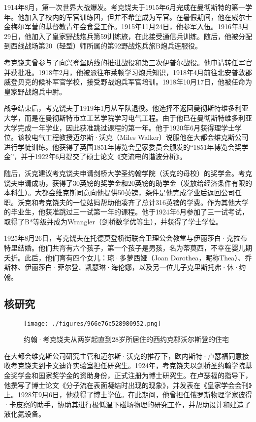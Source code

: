 1914年8月，第一次世界大战爆发。考克饶夫于1915年6月完成在曼彻斯特的第一学年。他加入了校内的军官训练团，但并不希望成为军官。在暑假期间，他在威尔士金梅尔军营的基督教青年会食堂工作。1915年11月24日，他参军入伍。1916年3月29日，他加入了皇家野战炮兵第59训练旅，在此接受通信兵训练。随后，他被分配到西线战场第20（轻型）师所属的第92野战炮兵旅B炮兵连服役。

考克饶夫曾参与了向兴登堡防线的推进战役和第三次伊普尔战役。他申请转任军官并获批准。1918年2月，他被派往布莱顿学习炮兵知识，1918年4月前往北安普敦郡威登贝克的候补军官学校，接受野战炮兵军官培训。1918年10月17日，他被任命为皇家野战炮兵中尉。

战争结束后，考克饶夫于1919年1月从军队退役。他选择不返回曼彻斯特维多利亚大学，而是在曼彻斯特市立工艺学院学习电气工程。由于他已在曼彻斯特维多利亚大学完成一年学业，因此获准跳过课程的第一年。他于1920年6月获得理学士学位。该校电气工程教授迈尔斯·沃克（Miles Walker）说服他在大都会维克斯公司进行学徒训练。他获得了英国1851年博览会皇家委员会颁发的“1851年博览会奖学金”，并于1922年6月提交了硕士论文《交流电的谐波分析》。

随后，沃克建议考克饶夫申请剑桥大学圣约翰学院（沃克的母校）的奖学金。考克饶夫申请成功，获得了30英镑的奖学金和20英镑的助学金（发放给经济条件有限的本科生）。大都会维克斯同意向他提供50英镑，条件是他完成学业后返回公司任职。沃克和考克饶夫的一位姑妈帮助他凑齐了总计316英镑的学费。作为其他大学的毕业生，他获准跳过三一试第一年的课程。他于1924年6月参加了三一试考试，取得了B*等级并成为Wrangler（剑桥数学优等生），并获得了学士学位。

1925年8月26日，考克饶夫在托德莫登桥街联合卫理公会教堂与伊丽莎白·克拉布特里结婚。他们共育有六个孩子，第一个孩子是男孩，名为蒂莫西，不幸在婴儿期夭折。此后，他们育有四个女儿：琼·多萝西娅（Joan Dorothea，昵称Thea）、乔斯林、伊丽莎白·菲尔登、凯瑟琳·海伦娜，以及另一位儿子克里斯托弗·休·约翰。
\subsection{核研究}
\begin{figure}[ht]
\centering
\texttt{[image: ./figures/966e76c528980952.png]}
\caption{约翰·考克饶夫从两岁起直到28岁所居住的西约克郡沃尔斯登的住宅} \label{fig_YHkrf_2}
\end{figure}
在大都会维克斯公司研究主管和迈尔斯·沃克的推荐下，欧内斯特·卢瑟福同意接收考克饶夫到卡文迪许实验室担任研究生。1924年，考克饶夫以剑桥圣约翰学院基金奖学金和国家奖学金的资助身份，正式注册为博士研究生。在卢瑟福的指导下，他撰写了博士论文《分子流在表面凝结时出现的现象》，并发表在《皇家学会会刊》上。1928年9月6日，他获得了博士学位。在此期间，他曾担任俄罗斯物理学家彼得·卡皮察的助手，协助其进行极低温下磁场物理的研究工作，并帮助设计和建造了液化氦设备。

